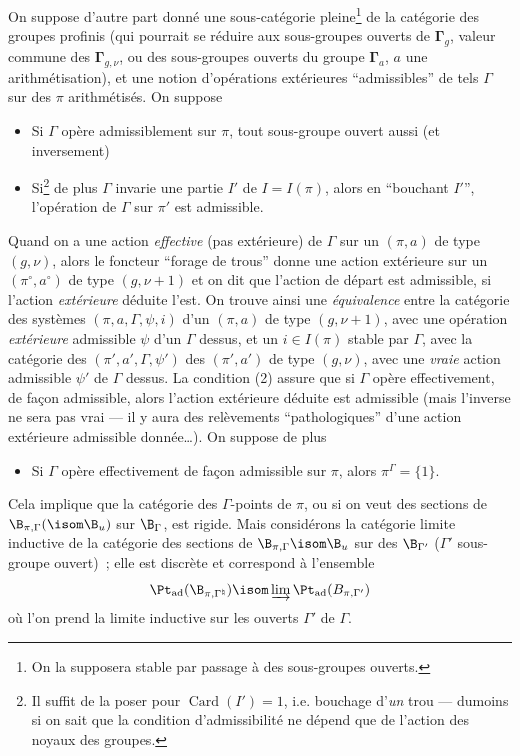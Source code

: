 On suppose d'autre part donné une sous-catégorie pleine\footnote{On la supposera stable par passage à des sous-groupes ouverts.} de la catégorie des groupes profinis (qui pourrait se réduire aux sous-groupes ouverts de $\boldsymbol{\Gamma}_g$, valeur commune des $\boldsymbol{\Gamma}_{g,\nu}$, ou des sous-groupes ouverts du groupe $\boldsymbol{\Gamma}_a$, $a$ une arithmétisation), et une notion d'opérations extérieures ``admissibles'' de tels $\Gamma$ sur des $\pi$ arithmétisés. On suppose
\begin{itemize}
	\item[(1)] Si $\Gamma$ opère admissiblement sur $\pi$,
tout sous-groupe ouvert aussi (et inversement)
	\item[(2)] Si\footnote{Il suffit de la poser pour ${\operatorname{Card}}(I')=1$, i.e. bouchage d'\emph{un} trou --- dumoins si on sait que la condition d'admissibilité ne dépend que de l'action des noyaux des groupes.} de plus $\Gamma$ invarie une partie $I'$ de $I=I(\pi)$, alors en ``bouchant $I'$'', l'opération de $\Gamma$ sur $\pi'$ est admissible.
\end{itemize}
Quand on a une action \emph{effective} (pas extérieure) de $\Gamma$ sur un $(\pi,a)$ de type $(g,\nu)$, alors le foncteur ``forage de trous'' donne une action extérieure sur un $(\pi^\circ, a^\circ)$ de type $(g,\nu+1)$ et on dit que l'action de  départ est admissible, si l'action \emph{extérieure} déduite l'est. On trouve ainsi une \emph{équivalence} entre la catégorie des systèmes $(\pi,a,\Gamma,\psi,i)$ d'un $(\pi,a)$ de type $(g,\nu+1)$, avec une opération \emph{extérieure} admissible $\psi$ d'un $\Gamma$ dessus, et un $i\in I(\pi)$ stable par $\Gamma$, avec la catégorie des $(\pi',a',\Gamma,\psi')$ des $(\pi',a')$ de type $(g,\nu)$, avec une \emph{vraie} action admissible $\psi'$ de $\Gamma$ dessus. La condition (2) assure que si $\Gamma$ opère effectivement, de fa\c{c}on admissible, alors l'action extérieure déduite est admissible (mais l'inverse ne sera pas vrai --- il y aura des relèvements ``pathologiques'' d'une action extérieure admissible donnée\dots). On suppose de plus
\begin{itemize}
	\item[(3)] Si $\Gamma$ opère effectivement de fa\c con admissible sur $\pi$, alors $\pi^\Gamma=\{1\}$.
\end{itemize}
Cela implique que la catégorie des $\Gamma$-points de $\pi$, ou si on veut des sections de $\B_{\pi,\Gamma}( \isom \B_u)$ sur $\B_\Gamma$, est rigide. Mais considérons la catégorie limite inductive de la catégorie des sections de $\B_{\pi,\Gamma} \isom \B_u$ sur des $\B_{\Gamma'}$ ($\Gamma'$ sous-groupe ouvert)~; elle est discrète et
correspond à l'ensemble
$$
{\Pt}_{\operatorname{ad}}(\B_{\pi,\Gamma^\natural}) \isom  \varinjlim {\Pt}_{\operatorname{ad}}(B_{\pi,\Gamma'})
$$
où l'on prend la limite inductive sur les ouverts $\Gamma'$ de $\Gamma$.

